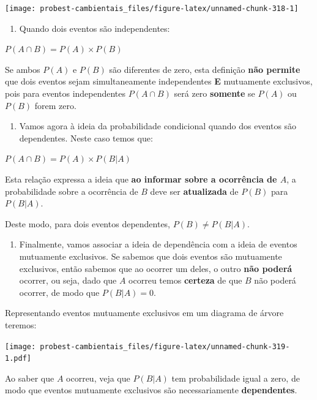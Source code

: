\documentclass[
]{book}
\providecommand{\tightlist}{%
  \setlength{\itemsep}{0pt}\setlength{\parskip}{0pt}}
\begin{document}
\begin{center}\texttt{[image: probest-cambientais\_files/figure-latex/unnamed-chunk-318-1]} \end{center}

\begin{enumerate}
\def\labelenumi{\arabic{enumi}.}
\setcounter{enumi}{3}
\tightlist
\item
  Quando dois eventos são independentes:
\end{enumerate}

\(P(A \cap B) = P(A) \times P(B)\)

Se ambos \(P(A)\) e \(P(B)\) são diferentes de zero, esta definição \textbf{não permite} que dois eventos sejam simultaneamente independentes \textbf{E} mutuamente exclusivos, pois para eventos independentes \(P(A \cap B)\) será zero \textbf{somente} se \(P(A)\) ou \(P(B)\) forem zero.

\begin{enumerate}
\def\labelenumi{\arabic{enumi}.}
\setcounter{enumi}{4}
\tightlist
\item
  Vamos agora à ideia da probabilidade condicional quando dos eventos são dependentes. Neste caso temos que:
\end{enumerate}

\(P(A \cap B) = P(A) \times P(B|A)\)

Esta relação expressa a ideia que \textbf{ao informar sobre a ocorrência de \(A\)}, a probabilidade sobre a ocorrência de \(B\) deve ser \textbf{atualizada} de \(P(B)\) para \(P(B|A)\).

Deste modo, para dois eventos dependentes, \(P(B) \ne P(B|A)\).

\begin{enumerate}
\def\labelenumi{\arabic{enumi}.}
\setcounter{enumi}{5}
\tightlist
\item
  Finalmente, vamos associar a ideia de dependência com a ideia de eventos mutuamente exclusivos. Se sabemos que dois eventos são mutuamente exclusivos, então sabemos que ao ocorrer um deles, o outro \textbf{não poderá} ocorrer, ou seja, dado que \(A\) ocorreu temos \textbf{certeza} de que \(B\) não poderá ocorrer, de modo que \(P(B|A) = 0\).
\end{enumerate}

Representando eventos mutuamente exclusivos em um diagrama de árvore teremos:

\texttt{[image: probest-cambientais\_files/figure-latex/unnamed-chunk-319-1.pdf]}

Ao saber que \(A\) ocorreu, veja que \(P(B|A)\) tem probabilidade igual a zero, de modo que eventos mutuamente exclusivos são necessariamente \textbf{dependentes}.
\end{document}
